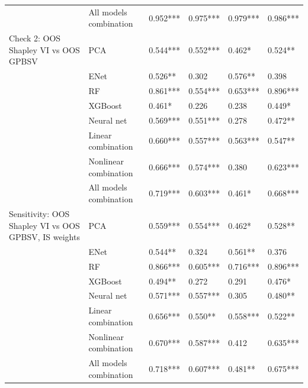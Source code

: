 \begin{tabular}{llllll}
                                                     & All models combination &  0.952*** &  0.975*** &  0.979*** &  0.986*** \\
Check 2: OOS Shapley VI vs OOS GPBSV & PCA &  0.544*** &  0.552*** &    0.462* &   0.524** \\
                                                     & ENet &   0.526** &     0.302 &   0.576** &     0.398 \\
                                                     & RF &  0.861*** &  0.554*** &  0.653*** &  0.896*** \\
                                                     & XGBoost &    0.461* &     0.226 &     0.238 &    0.449* \\
                                                     & Neural net &  0.569*** &  0.551*** &     0.278 &   0.472** \\
                                                     & Linear combination &  0.660*** &  0.557*** &  0.563*** &   0.547** \\
                                                     & Nonlinear combination &  0.666*** &  0.574*** &     0.380 &  0.623*** \\
                                                     & All models combination &  0.719*** &  0.603*** &    0.461* &  0.668*** \\
Sensitivity: OOS Shapley VI vs OOS GPBSV, IS weights & PCA &  0.559*** &  0.554*** &    0.462* &   0.528** \\
                                                     & ENet &   0.544** &     0.324 &   0.561** &     0.376 \\
                                                     & RF &  0.866*** &  0.605*** &  0.716*** &  0.896*** \\
                                                     & XGBoost &   0.494** &     0.272 &     0.291 &    0.476* \\
                                                     & Neural net &  0.571*** &  0.557*** &     0.305 &   0.480** \\
                                                     & Linear combination &  0.656*** &   0.550** &  0.558*** &   0.522** \\
                                                     & Nonlinear combination &  0.670*** &  0.587*** &     0.412 &  0.635*** \\
                                                     & All models combination &  0.718*** &  0.607*** &   0.481** &  0.675*** \\
\bottomrule
\end{tabular}

